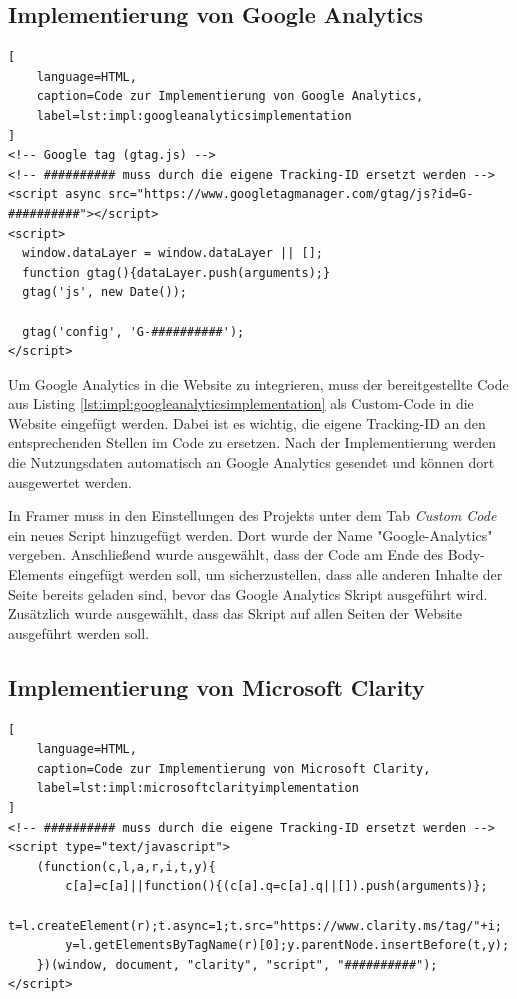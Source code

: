 \subsection{Implementierung von Google Analytics}
\begin{lstlisting}[
    language=HTML,
    caption=Code zur Implementierung von Google Analytics,
    label=lst:impl:googleanalyticsimplementation
]
<!-- Google tag (gtag.js) -->
<!-- ########## muss durch die eigene Tracking-ID ersetzt werden -->
<script async src="https://www.googletagmanager.com/gtag/js?id=G-##########"></script>
<script>
  window.dataLayer = window.dataLayer || [];
  function gtag(){dataLayer.push(arguments);}
  gtag('js', new Date());

  gtag('config', 'G-##########');
</script>
\end{lstlisting}

Um Google Analytics in die Website zu integrieren, muss der 
bereitgestellte Code aus Listing \ref{lst:impl:googleanalyticsimplementation} 
als Custom-Code in die Website eingefügt werden. 
Dabei ist es wichtig, die eigene Tracking-ID 
an den entsprechenden Stellen im Code zu ersetzen. 
Nach der Implementierung werden die Nutzungsdaten automatisch 
an Google Analytics gesendet und können dort ausgewertet werden.

In Framer muss in den Einstellungen des Projekts unter dem Tab
\textit{Custom Code} ein neues Script hinzugefügt werden.
Dort wurde der Name "Google-Analytics" vergeben. 
Anschließend wurde ausgewählt, dass der Code am Ende
des Body-Elements eingefügt werden soll, um sicherzustellen, 
dass alle anderen Inhalte der Seite bereits geladen sind, 
bevor das Google Analytics Skript ausgeführt wird.
Zusätzlich wurde ausgewählt, dass das Skript auf allen Seiten
der Website ausgeführt werden soll.

\subsection{Implementierung von Microsoft Clarity}
\begin{lstlisting}[
    language=HTML,
    caption=Code zur Implementierung von Microsoft Clarity,
    label=lst:impl:microsoftclarityimplementation
]
<!-- ########## muss durch die eigene Tracking-ID ersetzt werden -->
<script type="text/javascript">
    (function(c,l,a,r,i,t,y){
        c[a]=c[a]||function(){(c[a].q=c[a].q||[]).push(arguments)};
        t=l.createElement(r);t.async=1;t.src="https://www.clarity.ms/tag/"+i;
        y=l.getElementsByTagName(r)[0];y.parentNode.insertBefore(t,y);
    })(window, document, "clarity", "script", "##########");
</script>
\end{lstlisting}

